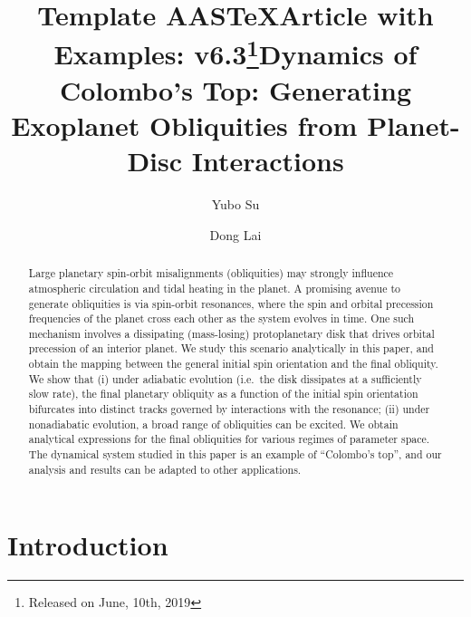 \documentclass[twocolumn,twocolappendix]{aastex63}
\newcommand\aastex{AAS\TeX}
\begin{document}
\title{Template \aastex Article with Examples:
v6.3\footnote{Released on June, 10th, 2019}}

\title{Dynamics of Colombo's Top: Generating Exoplanet Obliquities from
Planet-Disc Interactions}



\author[0000-0001-8283-3425]{Yubo Su}%

\author[0000-0002-1934-6250]{Dong Lai}%

\begin{abstract}

Large planetary spin-orbit misalignments (obliquities) may strongly influence
atmospheric circulation and tidal heating in the planet. A promising avenue to
generate obliquities is via spin-orbit resonances, where the spin and orbital
precession frequencies of the planet cross each other as the system evolves in
time. One such mechanism involves a dissipating (mass-losing) protoplanetary
disk that drives orbital precession of an interior planet. We study this
scenario analytically in this paper, and obtain the mapping between the general
initial spin orientation and the final obliquity. We show that (i) under
adiabatic evolution (i.e.\ the disk dissipates at a sufficiently slow rate), the
final planetary obliquity as a function of the initial spin orientation
bifurcates into distinct tracks governed by interactions with the resonance;
(ii) under nonadiabatic evolution, a broad range of obliquities can be excited.
We obtain analytical expressions for the final obliquities for various
regimes of parameter space. The dynamical system studied in this paper is an
example of ``Colombo's top'', and our analysis and results can be adapted to
other applications.

\end{abstract}


\section{Introduction}\label{s:intro}
\end{document}
